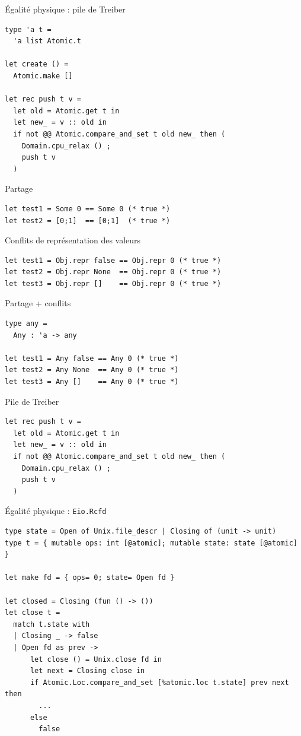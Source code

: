 \begin{frame}[fragile]{Égalité physique : pile de Treiber}
\large
\begin{verbatim}
type 'a t =
  'a list Atomic.t

let create () =
  Atomic.make []

let rec push t v =
  let old = Atomic.get t in
  let new_ = v :: old in
  if not @@ Atomic.compare_and_set t old new_ then (
    Domain.cpu_relax () ;
    push t v
  )
\end{verbatim}
\end{frame}

\begin{frame}[fragile]{Partage}
\Large
\begin{verbatim}
let test1 = Some 0 == Some 0 (* true *)
let test2 = [0;1]  == [0;1]  (* true *)
\end{verbatim}
\end{frame}

\begin{frame}[fragile]{Conflits de représentation des valeurs}
\Large
\begin{verbatim}
let test1 = Obj.repr false == Obj.repr 0 (* true *)
let test2 = Obj.repr None  == Obj.repr 0 (* true *)
let test3 = Obj.repr []    == Obj.repr 0 (* true *)
\end{verbatim}
\end{frame}

\begin{frame}[fragile]{Partage + conflits}
\Large
\begin{verbatim}
type any =
  Any : 'a -> any

let test1 = Any false == Any 0 (* true *)
let test2 = Any None  == Any 0 (* true *)
let test3 = Any []    == Any 0 (* true *)
\end{verbatim}
\end{frame}

\begin{frame}[fragile]{Pile de Treiber}
\Large
\begin{verbatim}
let rec push t v =
  let old = Atomic.get t in
  let new_ = v :: old in
  if not @@ Atomic.compare_and_set t old new_ then (
    Domain.cpu_relax () ;
    push t v
  )
\end{verbatim}
\end{frame}

\begin{frame}[fragile]{Égalité physique : \texttt{Eio.Rcfd}}
\begin{verbatim}
type state = Open of Unix.file_descr | Closing of (unit -> unit)
type t = { mutable ops: int [@atomic]; mutable state: state [@atomic] }

let make fd = { ops= 0; state= Open fd }

let closed = Closing (fun () -> ())
let close t =
  match t.state with
  | Closing _ -> false
  | Open fd as prev ->
      let close () = Unix.close fd in
      let next = Closing close in
      if Atomic.Loc.compare_and_set [%atomic.loc t.state] prev next then
        ...
      else
        false
\end{verbatim}
\end{frame}

